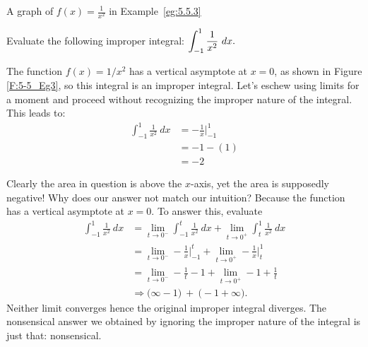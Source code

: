 \begin{marginfigure}[8cm]
\caption{A graph of $f(x)=\frac{1}{x^2}$ in Example~\ref{eg:5.5.3}}
\label{F:5-5_Eg3}
\end{marginfigure}

\begin{example} \label{eg:5.5.3} %
Evaluate the following improper integral: $\displaystyle  \int_{-1}^1\frac{1}{x^2}\ dx.$

\solution The function $f(x) = 1/x^2$ has a vertical asymptote at $x=0$, as shown in Figure \ref{F:5-5_Eg3}, so this integral is an improper integral. Let's eschew using limits for a moment and proceed without recognizing the improper nature of the integral. This leads to:
\begin{align*}
\int_{-1}^1\frac1{x^2}\ dx &= -\frac1x\Big|_{-1}^1\\
&= -1 - (1)\\
&=-2 
\end{align*}

Clearly the area in question is above the $x$-axis, yet the area is supposedly negative! Why does our answer not match our intuition?  Because the function has a vertical asymptote at $x = 0$. To answer this, evaluate 
\begin{align*}
\int_{-1}^1\frac1{x^2}\ dx &= \lim_{t\to0^-}\int_{-1}^t \frac1{x^2}\ dx + \lim_{t\to0^+}\int_t^1\frac1{x^2}\ dx \\
&= \lim_{t\to0^-}-\frac1x\Big|_{-1}^t + \lim_{t\to0^+}-\frac1x\Big|_t^1\\
&= \lim_{t\to0^-}-\frac1t-1 + \lim_{t\to0^+} -1+\frac1t\\
&\Rightarrow \Big(\infty-1\Big)\ + \ \Big(- 1+\infty\Big).
\end{align*}
Neither limit converges hence the original improper integral diverges. The nonsensical answer we obtained by ignoring the improper nature of the integral is just that: nonsensical.

\end{example}